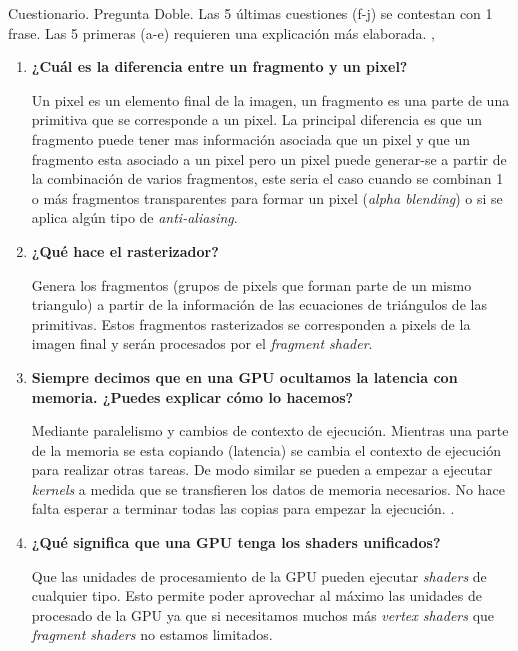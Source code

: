 
\begin{pregunta}{Cuestionario. Pregunta Doble. Las 5 últimas cuestiones (f-j) se contestan con 1 frase. Las 5
primeras (a-e) requieren una explicación más elaborada.}
\sep{}

\begin{enumerate}[label=\textbf{(\alph*)}]
    \item \textbf{¿Cuál es la diferencia entre un fragmento y un pixel?}

        Un pixel es un elemento final de la imagen, un fragmento es una parte de
        una primitiva que se corresponde a un pixel. La principal diferencia es
        que un fragmento puede tener mas información asociada que un pixel y que
        un fragmento esta asociado a un pixel pero un pixel puede generar-se a
        partir de la combinación de varios fragmentos, este seria el caso cuando
        se combinan 1 o más fragmentos transparentes para formar un pixel
        (\emph{alpha blending}) o si se aplica algún tipo de
        \emph{anti-aliasing}.

    \item \textbf{¿Qué hace el rasterizador?}

        Genera los fragmentos (grupos de pixels que forman parte de un mismo
        triangulo) a partir de la información de las ecuaciones de
        triángulos de las primitivas. Estos fragmentos rasterizados se
        corresponden a pixels de la imagen final y serán procesados por el
        \emph{fragment shader}.

\item \textbf{Siempre decimos que en una GPU ocultamos la latencia con memoria. ¿Puedes explicar cómo lo hacemos?}

        Mediante paralelismo y cambios de contexto de ejecución. Mientras una
        parte de la memoria se esta copiando (latencia) se cambia el contexto de
        ejecución para realizar otras tareas. De modo similar se pueden a
        empezar a ejecutar \emph{kernels} a medida que se transfieren los datos
        de memoria necesarios. No hace falta esperar a terminar todas las copias
        para empezar la ejecución. \cite{volkov_understanding_nodate}.

\item \textbf{¿Qué significa que una GPU tenga los shaders unificados?}

        Que las unidades de procesamiento de la GPU pueden ejecutar
        \emph{shaders} de cualquier tipo. Esto permite poder aprovechar al
        máximo las unidades de procesado de la GPU ya que si necesitamos muchos
        más \emph{vertex shaders} que \emph{fragment shaders} no estamos
        limitados.


\end{enumerate}
\end{pregunta}
